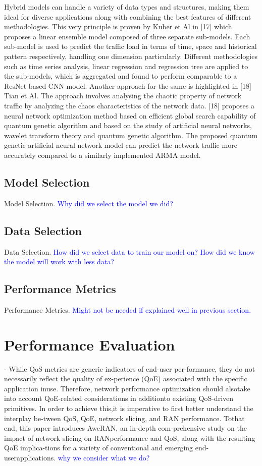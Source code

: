\documentclass[conference]{IEEEtran}
\begin{document}
Hybrid models can handle a variety of data types and structures, making them ideal for diverse applications along with combining the best features of different methodologies. This very principle is proven by Kuber et Al in [17] which proposes a linear ensemble model composed of three separate sub-models. Each sub-model is used to predict the traffic load in terms of time, space and historical pattern respectively, handling one dimension particularly. Different methodologies such as time series analysis, linear regression and regression tree are applied to the sub-models, which is aggregated and found to perform comparable to a ResNet-based CNN model. Another approach for the same is highlighted in [18] Tian et Al. The approach involves analysing the chaotic property of network traffic by analyzing the chaos characteristics of the network data. [18] proposes a neural network optimization method based on efficient global search capability of quantum genetic algorithm and based on the study of artificial neural networks, wavelet transform theory and quantum genetic algorithm. The proposed quantum genetic artificial neural network model can predict the network traffic more accurately compared to a similarly implemented ARMA model.\\

\subsection{Model Selection}
Model Selection. \textcolor{blue}{Why did we select the model we did?}

\subsection{Data Selection}
Data Selection. \textcolor{blue}{How did we select data to train our model on? How did we know the model will work with less data?}

\subsection{Performance Metrics}
Performance Metrics. \textcolor{blue}{Might not be needed if explained well in previous section.}

\section{Performance Evaluation}
- While QoS metrics are generic indicators of end-user per-formance, they do not necessarily reflect the quality of ex-perience (QoE) associated with the specific application inuse. Therefore, network performance optimization should alsotake into account QoE-related considerations in additionto existing QoS-driven primitives. In order to achieve this,it is imperative to first better understand the interplay be-tween QoS, QoE, network slicing, and RAN performance. Tothat end, this paper introduces AweRAN, an in-depth com-prehensive study on the impact of network slicing on RANperformance and QoS, along with the resulting QoE implica-tions for a variety of conventional and emerging end-userapplications. \textcolor{blue}{why we consider what we do?}
\end{document}
